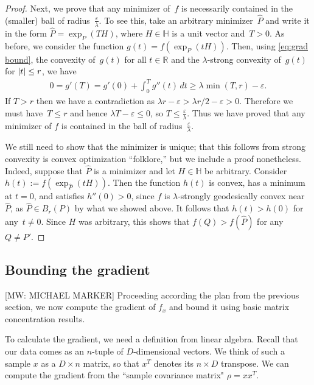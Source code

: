 \documentclass[aos]{imsart}
\theoremstyle{definition}
\numberwithin{equation}{section}
\DeclarePairedDelimiter{\abs}{\lvert}{\rvert}
\newcommand{\R}{{\mathbb{R}}}
\renewcommand{\H}{{\mathbb{H}}}
\newcommand{\eps}{\varepsilon}
\newcommand{\samp}{x}
\newcommand{\rv}{X}
\newcommand{\MW}[1]{{\color{red}[MW: #1]}}
\begin{document}
\begin{proof}
Next, we prove that any minimizer of~$f$ is necessarily contained in the (smaller) ball of radius~$\frac\eps\lambda$.
To see this, take an arbitrary minimizer~$\hat P$ and write it in the form $\hat P = \exp_P(TH)$, where $H\in \H$ is a unit vector and~$T>0$.
As before, we consider the function $g(t) = f(\exp_P(tH))$.
Then, using \cref{eq:grad bound}, the convexity of~$g(t)$ for all $t\in\R$ and the $\lambda$-strong convexity of~$g(t)$ for $\abs t \leq  r$, we have
\begin{align*}
  0 = g'(T) = g'(0) + \int_0^T g''(t) \, dt \geq \lambda \min(T,  r) - \eps.
\end{align*}
If $T> r$ then we have a contradiction as $\lambda r - \eps > \lambda r/2 - \eps > 0$.
Therefore we must have~$T\leq r$ and hence $\lambda T - \eps \leq 0$, so $T \leq \frac\eps\lambda$.
Thus we have proved that any minimizer of $f$ is contained in the ball of radius~$\frac\eps\lambda$.

We still need to show that the minimizer is unique; that this follows from strong convexity is convex optimization ``folklore,'' but we include a proof nonetheless.
Indeed, suppose that $\hat P$ is a minimizer and let $H\in \H$ be arbitrary.
Consider $h(t) := f(\exp_{\hat P}(tH))$.
Then the function $h(t)$ is convex, has a minimum at $t=0$, and satisfies $h''(0) > 0$, since $f$ is $\lambda$-strongly geodesically convex near~$\hat P$, as $\hat P \in B_r(P)$ by what we showed above.
It follows that $h(t) > h(0)$ for any~$t\neq0$.
Since $H$ was arbitrary, this shows that $f(Q) > f(\hat P)$ for any $Q\neq P'$.
\end{proof}

\subsection{Bounding the gradient}
\MW{MICHAEL MARKER}
Proceeding according the plan from the previous section, we now compute the gradient of $f_{\samp}$ and bound it using basic matrix concentration results.

To calculate the gradient, we need a definition from linear algebra. Recall that our data comes as an $n$-tuple of $D$-dimensional vectors. We think of such a sample $\samp$ as a $D \times n$ matrix, so that $\samp^T$ denotes its $n \times D$ transpose. We can compute the gradient from the ``sample covariance matrix" $\rho = \samp \samp^T$.
\end{document}
